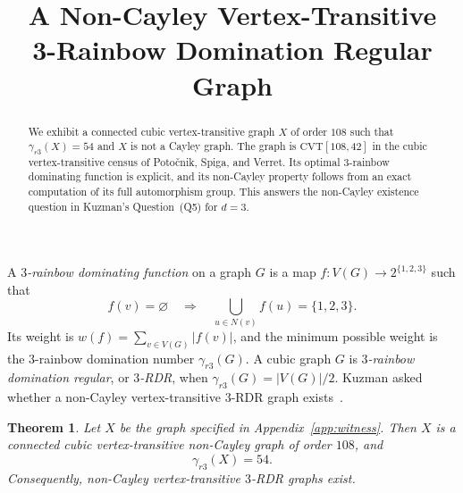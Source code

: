 \documentclass[11pt]{amsart}
\title[A non-Cayley vertex-transitive 3-RDR graph]
{A Non-Cayley Vertex-Transitive\\
3-Rainbow Domination Regular Graph}
\date{}
\newtheorem{theorem}{Theorem}
\theoremstyle{remark}
\newcommand{\gr}{\gamma_{r3}}
\begin{document}
\begin{abstract}
We exhibit a connected cubic vertex-transitive graph $X$ of order $108$ such
that $\gr(X)=54$ and $X$ is not a Cayley graph.  The graph is
$\mathrm{CVT}[108,42]$ in the cubic vertex-transitive census of
Poto\v{c}nik, Spiga, and Verret.  Its optimal $3$-rainbow dominating function
is explicit, and its non-Cayley property follows from an exact computation of
its full automorphism group.  This answers the non-Cayley existence question
in Kuzman's Question~\textup{(Q5)} for $d=3$.
\end{abstract}

\maketitle

A \emph{$3$-rainbow dominating function} on a graph $G$ is a map
$f\colon V(G)\to 2^{\{1,2,3\}}$ such that
\[
 f(v)=\varnothing
 \quad\Longrightarrow\quad
 \bigcup_{u\in N(v)}f(u)=\{1,2,3\}.
\]
Its weight is $w(f)=\sum_{v\in V(G)}|f(v)|$, and the minimum possible
weight is the $3$-rainbow domination number $\gr(G)$.  A cubic graph $G$ is
\emph{$3$-rainbow domination regular}, or \emph{$3$-RDR}, when
$\gr(G)=|V(G)|/2$.  Kuzman asked whether a non-Cayley vertex-transitive
$3$-RDR graph exists~\cite[Question~\textup{(Q5)}]{Kuzman2025}.

\begin{theorem}\label{thm:main}
Let $X$ be the graph specified in Appendix~\ref{app:witness}.  Then $X$ is a
connected cubic vertex-transitive non-Cayley graph of order $108$, and
\[
 \gr(X)=54.
\]
Consequently, non-Cayley vertex-transitive $3$-RDR graphs exist.
\end{theorem}
\end{document}
